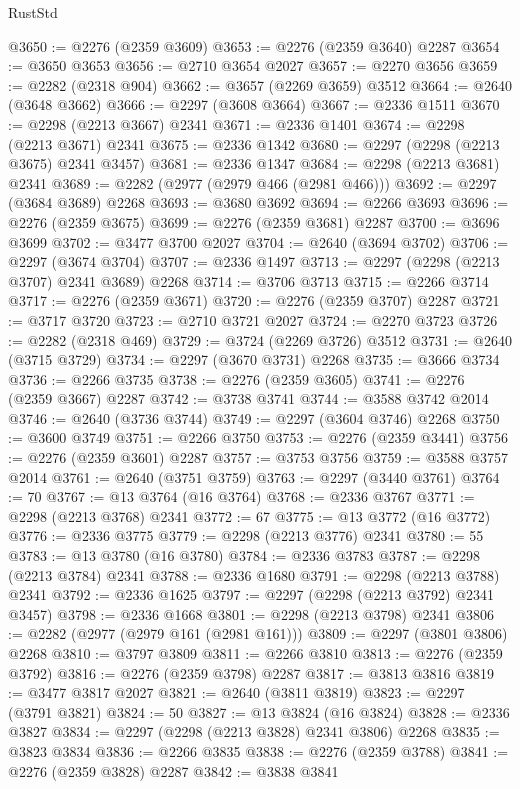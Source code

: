 \begin{lexlean}{RustStd}
\begin{coremodule}
@3650 := @2276 (@2359 @3609)
@3653 := @2276 (@2359 @3640) @2287
@3654 := @3650 @3653
@3656 := @2710 @3654 @2027
@3657 := @2270 @3656
@3659 := @2282 (@2318 @904)
@3662 := @3657 (@2269 @3659) @3512
@3664 := @2640 (@3648 @3662)
@3666 := @2297 (@3608 @3664)
@3667 := @2336 @1511
@3670 := @2298 (@2213 @3667) @2341
@3671 := @2336 @1401
@3674 := @2298 (@2213 @3671) @2341
@3675 := @2336 @1342
@3680 := @2297 (@2298 (@2213 @3675) @2341 @3457)
@3681 := @2336 @1347
@3684 := @2298 (@2213 @3681) @2341
@3689 := @2282 (@2977 (@2979 @466 (@2981 @466)))
@3692 := @2297 (@3684 @3689) @2268
@3693 := @3680 @3692
@3694 := @2266 @3693
@3696 := @2276 (@2359 @3675)
@3699 := @2276 (@2359 @3681) @2287
@3700 := @3696 @3699
@3702 := @3477 @3700 @2027
@3704 := @2640 (@3694 @3702)
@3706 := @2297 (@3674 @3704)
@3707 := @2336 @1497
@3713 := @2297 (@2298 (@2213 @3707) @2341 @3689) @2268
@3714 := @3706 @3713
@3715 := @2266 @3714
@3717 := @2276 (@2359 @3671)
@3720 := @2276 (@2359 @3707) @2287
@3721 := @3717 @3720
@3723 := @2710 @3721 @2027
@3724 := @2270 @3723
@3726 := @2282 (@2318 @469)
@3729 := @3724 (@2269 @3726) @3512
@3731 := @2640 (@3715 @3729)
@3734 := @2297 (@3670 @3731) @2268
@3735 := @3666 @3734
@3736 := @2266 @3735
@3738 := @2276 (@2359 @3605)
@3741 := @2276 (@2359 @3667) @2287
@3742 := @3738 @3741
@3744 := @3588 @3742 @2014
@3746 := @2640 (@3736 @3744)
@3749 := @2297 (@3604 @3746) @2268
@3750 := @3600 @3749
@3751 := @2266 @3750
@3753 := @2276 (@2359 @3441)
@3756 := @2276 (@2359 @3601) @2287
@3757 := @3753 @3756
@3759 := @3588 @3757 @2014
@3761 := @2640 (@3751 @3759)
@3763 := @2297 (@3440 @3761)
@3764 := 70
@3767 := @13 @3764 (@16 @3764)
@3768 := @2336 @3767
@3771 := @2298 (@2213 @3768) @2341
@3772 := 67
@3775 := @13 @3772 (@16 @3772)
@3776 := @2336 @3775
@3779 := @2298 (@2213 @3776) @2341
@3780 := 55
@3783 := @13 @3780 (@16 @3780)
@3784 := @2336 @3783
@3787 := @2298 (@2213 @3784) @2341
@3788 := @2336 @1680
@3791 := @2298 (@2213 @3788) @2341
@3792 := @2336 @1625
@3797 := @2297 (@2298 (@2213 @3792) @2341 @3457)
@3798 := @2336 @1668
@3801 := @2298 (@2213 @3798) @2341
@3806 := @2282 (@2977 (@2979 @161 (@2981 @161)))
@3809 := @2297 (@3801 @3806) @2268
@3810 := @3797 @3809
@3811 := @2266 @3810
@3813 := @2276 (@2359 @3792)
@3816 := @2276 (@2359 @3798) @2287
@3817 := @3813 @3816
@3819 := @3477 @3817 @2027
@3821 := @2640 (@3811 @3819)
@3823 := @2297 (@3791 @3821)
@3824 := 50
@3827 := @13 @3824 (@16 @3824)
@3828 := @2336 @3827
@3834 := @2297 (@2298 (@2213 @3828) @2341 @3806) @2268
@3835 := @3823 @3834
@3836 := @2266 @3835
@3838 := @2276 (@2359 @3788)
@3841 := @2276 (@2359 @3828) @2287
@3842 := @3838 @3841

\end{coremodule}
\end{lexlean}
